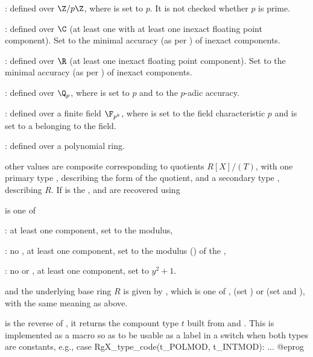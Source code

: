 \item {}: defined over $\Z/p\Z$, where  is set to $p$.
It is not checked whether $p$ is prime.

\item {}: defined over $\C$ (at least one  with at
least one inexact floating point  component). Set 
to the minimal accuracy (as per ) of inexact components.

\item {}: defined over $\R$ (at least one inexact floating point
 component). Set  to the minimal accuracy (as per
) of inexact components.

\item {}: defined over $\Q_p$, where  is set to $p$ and
 to the $p$-adic accuracy.

\item {}: defined over a finite field $\F_{p^k}$, where 
is set to the field characteristic $p$ and  is set to a
 belonging to the field.

\item {}: defined over a polynomial ring.

\item other values are composite corresponding to quotients $R[X]/(T)$, with
one primary type , describing the form of the quotient,
and a secondary type , describing $R$. If  is the
,  and  are recovered using


 is one of

: at least one  component,
set  to the modulus,

: no , at least one  component,
set  to the modulus () of the ,

: no  or , at least one 
component, set  to $y^2 + 1$.

and the underlying base ring $R$ is given by , which
is one of ,  (set ) or 
(set  and ), with the same meaning
as above.

 is the reverse of
, it returns the compount type $t$ built from
 and . This is implemented as a macro so as to be usable
as a label in a switch when both types are constants, e.g.,
\bprog
  case RgX_type_code(t_POLMOD, t_INTMOD): ...
@eprog

